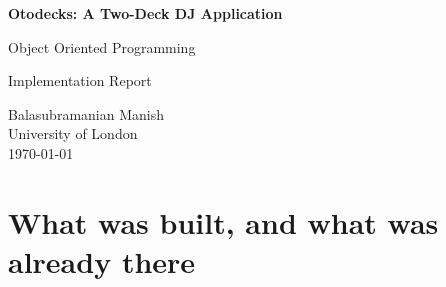 \documentclass[11pt,a4paper]{article}
\newcommand{\code}[1]{\texttt{#1}}
\begin{document}
\begin{titlepage}
    \centering

    \vspace*{\fill}

    {\Huge\bfseries Otodecks: A Two-Deck DJ Application\par}

    \vspace{1cm}

    {\Large Object Oriented Programming\par}
    {\large Implementation Report\par}

    \vspace{2cm}

    {\large
    Balasubramanian Manish\\
    University of London\\
    \today
    }

    \vspace*{\fill}

\end{titlepage}



\clearpage

\section{What was built, and what was already there}
\end{document}
